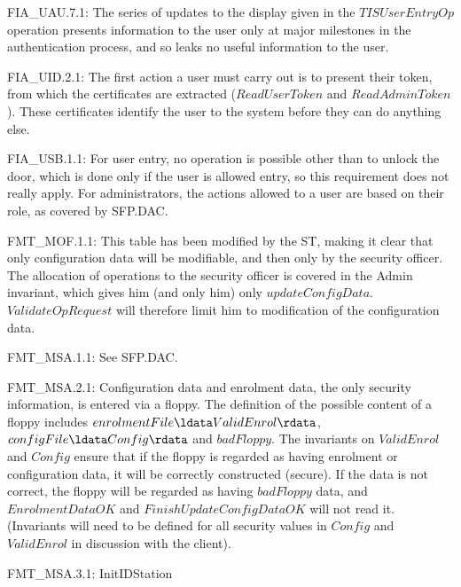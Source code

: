 {\footnotesize \sf 
FIA\_UAU.7.1:
}
\newline
	The series of updates to the display given in the
	$TISUserEntryOp$ operation presents information to the user only
	at major milestones in the authentication process, and so
	leaks no useful information to the user. 

{\footnotesize \sf 
FIA\_UID.2.1:
}
\newline
	The first action a user must carry out is to present their
	token, from which the certificates are extracted
	($ReadUserToken$ and $ReadAdminToken$). These certificates
	identify the user to the system before they can do anything
	else. 

{\footnotesize \sf 
FIA\_USB.1.1:
}
\newline
	For user entry, no operation is possible other than to unlock
	the door, which is done only if the user is allowed entry, so
	this requirement does not really apply. For administrators,
	the actions allowed to a user are based on their role, as
	covered by SFP.DAC. 

{\footnotesize \sf 
FMT\_MOF.1.1:
}
\newline
	This table has been modified by the ST, making it clear that
	only configuration data will be modifiable, and then only by
	the security officer. The allocation of operations to the
	security officer is covered in the Admin invariant, which
	gives him (and only him) only
	$updateConfigData$. $ValidateOpRequest$ will therefore limit him
	to modification of the configuration data. 

{\footnotesize \sf 
FMT\_MSA.1.1:
}
\newline
	See SFP.DAC.

{\footnotesize \sf 
FMT\_MSA.2.1:
}
\newline
	Configuration data and enrolment data, the only security
	information, is entered via a floppy. The definition of the
	possible content of a floppy includes 
	$enrolmentFile \ldata ValidEnrol \rdata$, $configFile \ldata
	Config \rdata$ and $badFloppy$. The invariants on
	$ValidEnrol$ and $Config$ ensure that if the floppy is regarded as
	having enrolment or configuration data, it will be correctly
	constructed (secure). If the data is not correct, the floppy
	will be regarded as having $badFloppy$ data, and $EnrolmentDataOK$
	and $FinishUpdateConfigDataOK$ will not read it. (Invariants
	will need to be defined for all security values in $Config$
	and $ValidEnrol$ in discussion with the client).

{\footnotesize \sf 
FMT\_MSA.3.1:
}
\newline
	InitIDStation

